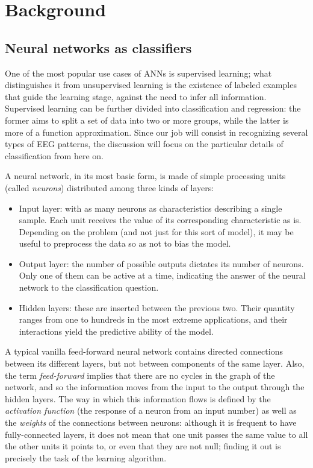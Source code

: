 \chapter{Background}\label{ch:background}

\section{Neural networks as classifiers}

	One of the most popular use cases of \acs{ANN}s is supervised learning; what distinguishes it from unsupervised learning is the existence of labeled examples that guide the learning stage, against the need to infer all information. Supervised learning can be further divided into classification and regression: the former aims to split a set of data into two or more groups, while the latter is more of a function approximation. Since our job will consist in recognizing several types of \acs{EEG} patterns, the discussion will focus on the particular details of classification from here on.

	A neural network, in its most basic form, is made of simple processing units (called \textit{neurons}) distributed among three kinds of layers:

	\begin{itemize}

		\item
		Input layer: with as many neurons as characteristics describing a single sample. Each unit receives the value of its corresponding characteristic as is. Depending on the problem (and not just for this sort of model), it may be useful to preprocess the data so as not to bias the model.

		\item
		Output layer: the number of possible outputs dictates its number of neurons. Only one of them can be active at a time, indicating the answer of the neural network to the classification question.

		\item
		Hidden layers: these are inserted between the previous two. Their quantity ranges from one to hundreds in the most extreme applications, and their interactions yield the predictive ability of the model.

	\end{itemize}

	A typical vanilla feed-forward neural network contains directed connections between its different layers, but not between components of the same layer. Also, the term \textit{feed-forward} implies that there are no cycles in the graph of the network, and so the information moves from the input to the output through the hidden layers. The way in which this information flows is defined by the \textit{activation function} (the response of a neuron from an input number) as well as the \textit{weights} of the connections between neurons: although it is frequent to have fully-connected layers, it does not mean that one unit passes the same value to all the other units it points to, or even that they are not null; finding it out is precisely the task of the learning algorithm.

